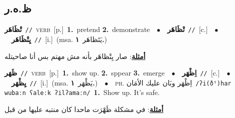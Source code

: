 \documentclass[10pt,a4paper,twoside]{article} %
\begin{document}
\begin{multicols}{2}
\vspace{-3mm}
\subsection*{\color{blue}\foreignlanguage{arabic}{ظ.ه.ر}\color{blue}{}} 

{\setlength\topsep{0pt}\textbf{\foreignlanguage{arabic}{تْظَاهَر}}\ {\color{gray}\texttt{//}\color{black}}\ \textsc{verb}\ [p.]\ \textbf{1.}~pretend  \textbf{2.}~demonstrate\ \ $\bullet$\ \ \setlength\topsep{0pt}\textbf{\foreignlanguage{arabic}{تْظَاهَر}}\ {\color{gray}\texttt{//}\color{black}}\ [c.]\ \ $\bullet$\ \ \setlength\topsep{0pt}\textbf{\foreignlanguage{arabic}{يِتْظَاهَر}}\ {\color{gray}\texttt{//}\color{black}}\ [i.]\ \color{gray}(msa. \foreignlanguage{arabic}{يَتَظاهَر}~\foreignlanguage{arabic}{\textbf{١.}})\color{black}\  \begin{flushright}\color{gray}\foreignlanguage{arabic}{\textbf{\underline{\foreignlanguage{arabic}{أمثلة}}}: صار يِتْظاهَر بأنه مش مهتم بس أنا صاحيتله}\end{flushright}\color{black}} \vspace{2mm}

{\setlength\topsep{0pt}\textbf{\foreignlanguage{arabic}{ظَهَر}}\ {\color{gray}\texttt{//}\color{black}}\ \textsc{verb}\ [p.]\ \textbf{1.}~show up.  \textbf{2.}~sppear  \textbf{3.}~emerge\ \ $\bullet$\ \ \setlength\topsep{0pt}\textbf{\foreignlanguage{arabic}{اِظْهَر}}\ {\color{gray}\texttt{//}\color{black}}\ [c.]\ \ $\bullet$\ \ \setlength\topsep{0pt}\textbf{\foreignlanguage{arabic}{يِظْهَر}}\ {\color{gray}\texttt{//}\color{black}}\ [i.]\ \color{gray}(msa. \foreignlanguage{arabic}{يَظْهَر}~\foreignlanguage{arabic}{\textbf{١.}})\color{black}\ \ $\bullet$\ \ \textsc{ph.} \color{gray} \foreignlanguage{arabic}{اِظْهَر وبَان عليك الأمَان}\color{black}\ {\color{gray}\texttt{/{\sffamily ʔi(ðˤ)har wubaːn ʕaleːk ʔilʔamaːn}/}\color{black}}\ \textbf{1.}~Show up. It's safe.\  \begin{flushright}\color{gray}\foreignlanguage{arabic}{\textbf{\underline{\foreignlanguage{arabic}{أمثلة}}}: في مشكلة ظَهْرَت ماحدا كان منتبه عليها من قبل}\end{flushright}\color{black}} \vspace{2mm}


\end{multicols}
\end{document}
